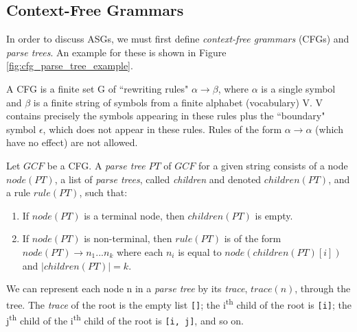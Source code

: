 \subsection{Context-Free Grammars}

In order to discuss ASGs, we must first define \textit{context-free grammars} (CFGs) and \textit{parse trees}. An example for these is shown in Figure \ref{fig:cfg_parse_tree_example}.

\begin{definition}
A CFG is a finite set G of ``rewriting rules" $\alpha \to \beta$, where $\alpha$ is a single symbol and $\beta$ is a finite string of symbols from a finite alphabet (vocabulary) V. V contains precisely the symbols appearing in these rules plus the ``boundary" symbol $\epsilon$, which does not appear in these rules. Rules of the form $\alpha \to \alpha$ (which have no effect) are not allowed.
\end{definition}

\begin{definition}
Let $GCF$ be a CFG. A \textit{parse tree} $PT$ of $GCF$ for a given string consists of a node $node(PT)$, a list of \textit{parse trees}, called \textit{children} and denoted $children(PT)$, and a rule $rule(PT)$, such that:
\begin{enumerate}[nolistsep]
\item If $node(PT)$ is a terminal node, then $children(PT)$ is empty.
\item If $node(PT)$ is non-terminal, then $rule(PT)$ is of the form $node(PT) \to n_1 ... n_k$ where each $n_i$ is equal to $node(children(PT)[i])$ and $|children(PT)| = k$.
\end{enumerate}
\end{definition}

\begin{definition}
We can represent each node n in a \textit{parse tree} by its \textit{trace}, $trace(n)$, through the tree. The \textit{trace} of the root is the empty list \texttt{[]}; the i\textsuperscript{th} child of the root is \texttt{[i]}; the j\textsuperscript{th} child of the i\textsuperscript{th} child of the root is \texttt{[i, j]}, and so on.
\end{definition}

